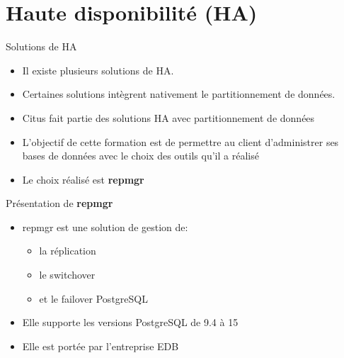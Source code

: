 
\section{Haute disponibilité (HA)}


\begin{frame}[fragile]{Solutions de HA}

   \begin{itemize}
      \item Il existe plusieurs solutions de HA.
      \item Certaines solutions intègrent nativement le partitionnement de données.
      \item Citus fait partie des solutions HA avec partitionnement de données
      \item L'objectif de cette formation est de permettre au client d'administrer ses bases de données avec le choix des outils qu'il a réalisé
      \item Le choix réalisé est \textbf{repmgr}
   \end{itemize}

\begin{toile}
\end{toile}

\end{frame}


\begin{frame}[fragile]{Présentation de \textbf{repmgr}}

   \begin{itemize}
      \item repmgr est une solution de gestion de:
         \begin{itemize}
            \item la réplication
            \item le switchover
            \item et le failover PostgreSQL
         \end{itemize}
      \item Elle supporte les versions PostgreSQL de 9.4 à 15
      \item Elle est portée par l'entreprise EDB
   \end{itemize}

\end{frame}

